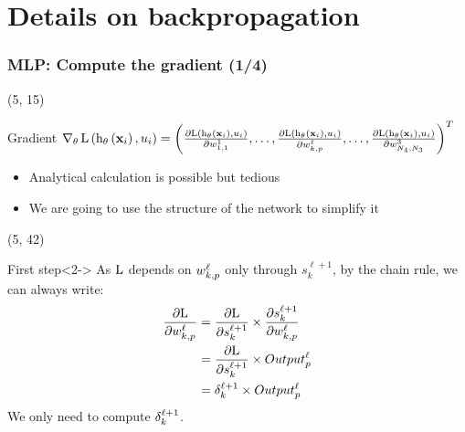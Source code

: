 \section{Details on backpropagation}

\begin{frame}[label=Backpropagation]
  \frametitle{\acl{MLP}: Compute the gradient (1/4)}

  \begin{textblock}{90}(5, 15)
    \begin{block}{Gradient}
      $
      \operatorname{\nabla}_{\mathbf{\theta}} \mathrm{L} \left ( {\mathrm{h}_{\mathbf{\theta}} \left ( {\mathbf{x}_i} \right ), u_i} \right ) =
      \left( \frac{\partial \mathrm{L} \left ( {\mathrm{h}_{\mathbf{\theta}} \left ( {\mathbf{x}_i} \right ),
            u_i} \right )}{\partial w_{1,1}^1}, \ldots, \frac{\partial \mathrm{L} \left ( {\mathrm{h}_{\mathbf{\theta}} \left ( {\mathbf{x}_i} \right ), u_i} \right )}{\partial w_{k,p}^{\ell}},\ldots,\frac{\partial \mathrm{L} \left ( {\mathrm{h}_{\mathbf{\theta}} \left ( {\mathbf{x}_i} \right ), u_i} \right )}{\partial w_{N_{4},N_{3}}^{3}} \right)^T
      $

      \begin{itemize}
      \item Analytical calculation is possible but tedious
      \item We are going to use the structure of the network to simplify it
      \end{itemize}
    \end{block}
  \end{textblock}

  \begin{textblock}{90}(5, 42)
    \begin{block}{First step}<2->
      As $\mathrm{L}$ depends on $w_{k, p}^{\ell}$ only through
      $s_{k}^{\ell+1}$, by the chain rule, we can always write:
      \begin{equation*}
        \begin{split}
          \frac{\partial \mathrm{L}}{\partial w_{k,p}^{\ell}} & =
             \frac{\partial \mathrm{L}}{\partial s_{k}^{\ell+1}} \times \frac{\partial s_{k}^{\ell+1}}{\partial w_{k,p}^{\ell}} \\
                                                    & =
                                                      \frac{\partial \mathrm{L}}{\partial s_{k}^{\ell+1}} \times Output_{p}^{\ell} \\
                                                     & =
                                                       \delta_{k}^{\ell+1} \times Output_{p}^{\ell}
        \end{split}
      \end{equation*}
      We only need to compute $\delta_{k}^{\ell+1}$.
    \end{block}
  \end{textblock}
\end{frame}

